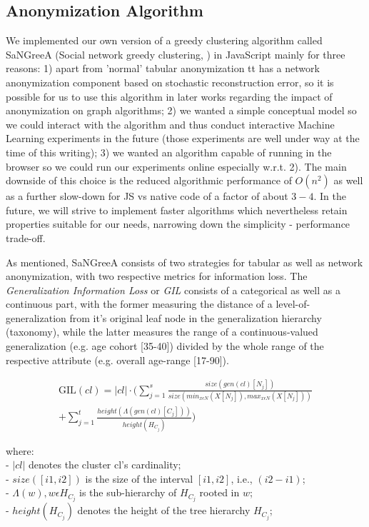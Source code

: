 \documentclass{llncs}
\providecommand{\abs}[1]{\lvert#1\rvert}
\begin{document}
\subsection{Anonymization Algorithm}
\label{ssect:algorithm}

We implemented our own version of a greedy clustering algorithm called SaNGreeA (Social network greedy clustering, \cite{campan2009data}) in JavaScript mainly for three reasons: 1) apart from 'normal' tabular anonymization tt has a network anonymization component based on stochastic reconstruction error, so it is possible for us to use this algorithm in later works regarding the impact of anonymization on graph algorithms; 2) we wanted a simple conceptual model so we could interact with the algorithm and thus conduct interactive Machine Learning experiments in the future (those experiments are well under way at the time of this writing); 3) we wanted an algorithm capable of running in the browser so we could run our experiments online especially w.r.t. 2). The main downside of this choice is the reduced algorithmic performance of $O(n^2)$ as well as a further slow-down for JS vs native code of a factor of about $3-4$. In the future, we will strive to implement faster algorithms which nevertheless retain properties suitable for our needs, narrowing down the simplicity - performance trade-off.

As mentioned, SaNGreeA consists of two strategies for tabular as well as network anonymization, with two respective metrics for information loss. The \textit{Generalization Information Loss} or \emph{GIL} consists of a categorical as well as a continuous part, with the former measuring the distance of a level-of-generalization from it's original leaf node in the generalization hierarchy (taxonomy), while the latter measures the range of a continuous-valued generalization (e.g. age cohort [35-40]) divided by the whole range of the respective attribute (e.g. overall age-range [17-90]).


\begin{equation*}
\begin{split}
\text{GIL}(cl) = \abs{cl} \cdot (\sum_{j=1}^{s} \frac{size(gen(cl)[N_j])}{size(min_{x \epsilon N} (X[N_j]), max_{x \epsilon N} (X[N_j]))} \\ 
+ \sum_{j=1}^{t} \frac{height(\Lambda(gen(cl)[C_j]))}{height(H_{C_j})})    
\end{split}
\end{equation*}


where:\\
- $\abs{cl}$ denotes the cluster cl's cardinality; \\
- $size([i1,i2])$ is the size of the interval $[i1,i2]$, i.e., $(i2-i1)$; \\
- $\Lambda(w), w \epsilon H_{C_j}$ is the sub-hierarchy of $H_{C_j}$ rooted in $w$; \\
- $height(H_{C_j})$ denotes the height of the tree hierarchy $H_{C_j}$; \\
\end{document}
